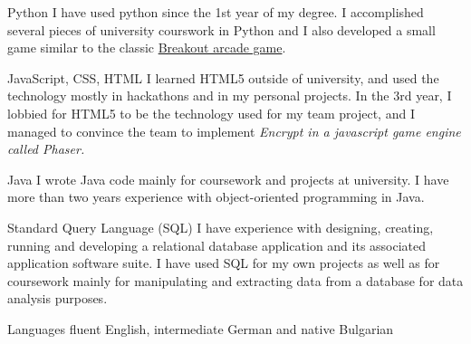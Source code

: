 \documentclass{tccv}
\begin{document}
\begin{skillist}

\item{Python} {I have used python since the 1st year of my degree. I accomplished several pieces of university courswork in Python and I also developed a small game similar to the classic \href{http://en.wikipedia.org/wiki/Breakout_(video_game)}{Breakout arcade game}.}

\item{JavaScript, CSS, HTML} {I learned HTML5 outside of university, and used the technology mostly in hackathons and in my personal projects. In the 3rd year, I lobbied for HTML5 to be the technology used for my team project, and I managed to convince the team to implement \it{Encrypt} in a javascript game engine called Phaser.}

\item{Java}
{I wrote Java code mainly for coursework and projects at university. I have more than two years experience with object-oriented programming in Java.}

\item{Standard Query Language (SQL)} %
 {I have experience with designing, creating, running and developing a relational database application and its associated application software suite. I have used SQL for my own projects as well as for coursework mainly for manipulating and extracting data from a database for data analysis purposes.}
\item {Languages } {fluent English, intermediate German and native Bulgarian}
\end{skillist}
\end{document}
